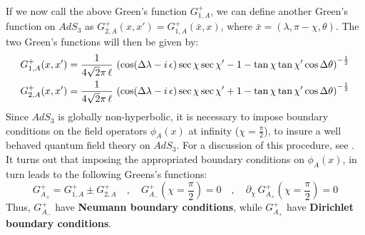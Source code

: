 %
%
If we now call the above Green's function $G^+_{1, A}$, we can define another Green's function on $AdS_3$ as $G^+_{2,A}(x,x') = G^+_{1,A}(\bar{x}, x)$, where $\bar{x}= (\lambda, \pi - \chi, \theta)$. The two Green's functions will then be given by:
%
%
\begin{align}
G^+_{1,A}(x,x') & = \frac{1}{4 \sqrt{2} \pi \, \ell} \, 
\left(
\cos (\Delta \lambda - i \, \epsilon) \sec \chi  \sec \chi'  - 1 - \tan \chi  \tan \chi'  \cos \Delta \theta
\right)^{-\frac{1}{2}}
%
\notag\\
%
G^+_{2,A}(x,x') & = \frac{1}{4 \sqrt{2} \pi \, \ell} \,
\left(
\cos (\Delta \lambda - i \, \epsilon) \sec \chi  \sec \chi'  + 1 - \tan \chi  \tan \chi'  \cos \Delta \theta
\right)^{-\frac{1}{2}} \label{Greens_functions}
\end{align}
%
%
%
%
%
%
Since $AdS_3$ is globally non-hyperbolic, it is necessary to impose boundary conditions on the field operators $\phi_A(x)$ at infinity ($\chi = \frac{\pi}{2}$), to insure a well behaved quantum field theory on $AdS_3$. For a discussion of this procedure, see \cite{Green}. It turns out that imposing the appropriated boundary conditions on $\phi_A(x)$, in turn leads to the following Greens's functions:
%
%
\begin{equation}
G_{A_{\pm}}^+ = G^+_{1,A} \pm G^+_{2,A}
\quad , \quad
G_{A_{-}}^+ \left( \chi = \frac{\pi}{2} \right) = 0
\quad , \quad
\partial_{\chi} \, G_{A_{+}}^+ \left( \chi = \frac{\pi}{2} \right) = 0
\end{equation}
%
%
Thus, $G_{A_{-}}^+$ have \textbf{Neumann boundary conditions}, while $G_{A_{+}}^+$ have \textbf{Dirichlet boundary conditions}.

